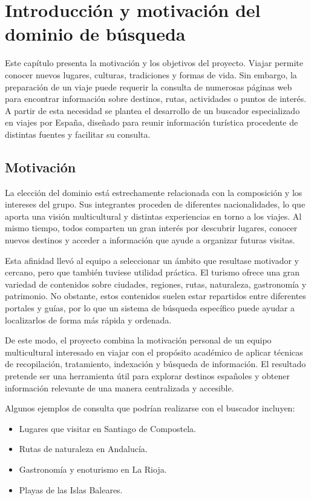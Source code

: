 \chapter{Introducción y motivación del dominio de búsqueda} 
\label{chap:introduccion} 
Este capítulo presenta la motivación y los objetivos del proyecto.
Viajar permite conocer nuevos lugares, culturas, tradiciones y formas de vida.
Sin embargo, la preparación de un viaje puede requerir la consulta de numerosas 
páginas web para encontrar información sobre destinos, rutas, actividades o puntos 
de interés. A partir de esta necesidad se plantea el desarrollo de un buscador 
especializado en viajes por España, diseñado para reunir información turística 
procedente de distintas fuentes y facilitar su consulta.

\section{Motivación}
La elección del dominio está estrechamente relacionada con la composición y los 
intereses del grupo. Sus integrantes proceden de diferentes nacionalidades, lo que
 aporta una visión multicultural y distintas experiencias en torno a los viajes. 
 Al mismo tiempo, todos comparten un gran interés por descubrir lugares, conocer
  nuevos destinos y acceder a información que ayude a organizar futuras visitas.

Esta afinidad llevó al equipo a seleccionar un ámbito que resultase motivador y cercano,
 pero que también tuviese utilidad práctica. El turismo ofrece una gran variedad de 
 contenidos sobre ciudades, regiones, rutas, naturaleza, gastronomía y patrimonio. No 
 obstante, estos contenidos suelen estar repartidos entre diferentes portales y guías,
  por lo que un sistema de búsqueda específico puede ayudar a localizarlos de forma más rápida y ordenada.

De este modo, el proyecto combina la motivación personal de un equipo multicultural
interesado en viajar con el propósito académico de aplicar técnicas de recopilación,
tratamiento, indexación y búsqueda de información. El resultado pretende ser una herramienta
útil para explorar destinos españoles y obtener información relevante de una manera centralizada y accesible.

Algunos ejemplos de consulta que podrían realizarse con el buscador incluyen:
\begin{itemize}
    \item Lugares que visitar en Santiago de Compostela.
    \item Rutas de naturaleza en Andalucía.
    \item Gastronomía y enoturismo en La Rioja.
    \item Playas de las Islas Baleares.
\end{itemize}

